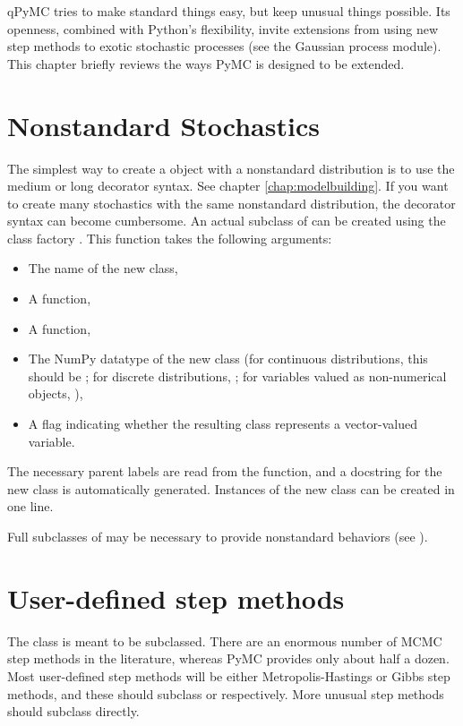 qPyMC tries to make standard things easy, but keep unusual things possible. Its openness, combined with Python's flexibility, invite extensions from using new step methods to exotic stochastic processes (see the Gaussian process module). This chapter briefly reviews the ways PyMC is designed to be extended.

\hypertarget{nonstandard}{}
\section{Nonstandard Stochastics} \label{nonstandard}

The simplest way to create a  object with a nonstandard distribution is to use the medium or long decorator syntax. See chapter \ref{chap:modelbuilding}. If you want to create many stochastics with the same nonstandard distribution, the decorator syntax can become cumbersome. An actual subclass of  can be created using the class factory . This function takes the following arguments:
\begin{itemize}
   \item The name of the new class,
   \item A  function,
   \item A  function,
   \item The NumPy datatype of the new class (for continuous distributions, this should be ; for discrete distributions, ; for variables valued as non-numerical objects, ),
   \item A flag indicating whether the resulting class represents a vector-valued variable.
\end{itemize}
The necessary parent labels are read from the  function, and a docstring for the new class is automatically generated. Instances of the new class can be created in one line.

Full subclasses of  may be necessary to provide nonstandard behaviors (see ).

\hypertarget{custom-stepper}{}
\section{User-defined step methods} \label{custom-stepper}
The  class is meant to be subclassed. There are an enormous number of MCMC step methods in the literature, whereas PyMC provides only about half a dozen. Most user-defined step methods will be either Metropolis-Hastings or Gibbs step methods, and these should subclass  or  respectively. More unusual step methods should subclass  directly.

